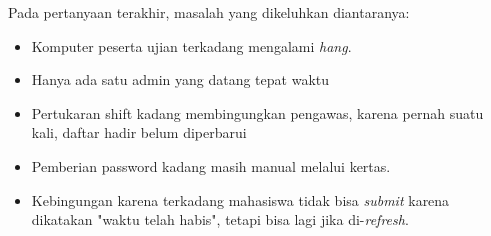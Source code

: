     Pada pertanyaan terakhir, masalah yang dikeluhkan diantaranya:
    \begin{itemize}
        \item Komputer peserta ujian terkadang mengalami \textit{hang}.
        
        \item Hanya ada satu admin yang datang tepat waktu
        
        \item Pertukaran shift kadang membingungkan pengawas, karena pernah
        suatu kali, daftar hadir belum diperbarui
        
        \item Pemberian password kadang masih manual melalui kertas.
        
        \item Kebingungan karena terkadang mahasiswa tidak bisa \textit{submit}
        karena dikatakan "waktu telah habis", tetapi bisa lagi jika
        di-\textit{refresh}.
    \end{itemize}

    
